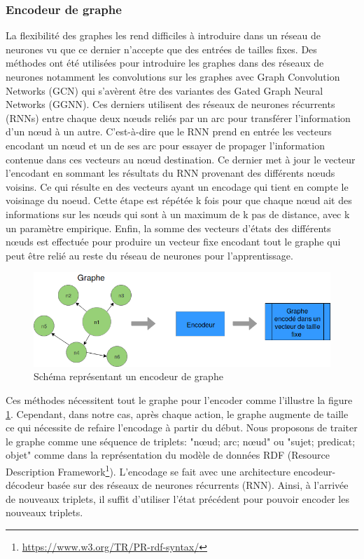 \subsubsection*{Encodeur de graphe}
La flexibilité des graphes les rend difficiles à introduire dans un réseau de neurones vu que ce dernier n'accepte que des entrées de tailles fixes. Des méthodes ont été utilisées pour introduire les graphes dans des réseaux de neurones notamment les convolutions sur les graphes avec Graph Convolution Networks (GCN)\citep{KipfW17} qui s'avèrent être des variantes des Gated Graph Neural Networks (GGNN)\citep{Li2016GatedGS}. Ces derniers utilisent des réseaux de neurones récurrents (RNNs) entre chaque deux n\oe{}uds reliés par un arc pour transférer l'information d'un n\oe{}ud à un autre. C'est-à-dire que le RNN prend en entrée les vecteurs encodant un n\oe{}ud et un de ses arc pour essayer de propager l'information contenue dans ces vecteurs au n\oe{}ud destination. Ce dernier met à jour le vecteur l'encodant en sommant les résultats du RNN provenant des différents n\oe{}uds voisins. Ce qui résulte en des vecteurs ayant un encodage qui tient en compte le voisinage du noeud. Cette étape est répétée k fois pour que chaque n\oe{}ud ait des informations sur les n\oe{}uds qui sont à un maximum de k pas de distance, avec k un paramètre empirique. Enfin, la somme des vecteurs d'états des différents n\oe{}uds est effectuée pour produire un vecteur fixe encodant tout le graphe qui peut être relié au reste du réseau de neurones pour l'apprentissage.
\begin{figure}[H] 
	\centering
	\includegraphics[width=0.9\linewidth]{images/Conception/DM/encoder.png}
	\caption{Schéma représentant un encodeur de graphe}\label{encoder}
	
\end{figure}
\par Ces méthodes nécessitent tout le graphe pour l'encoder comme l'illustre la figure \ref{encoder}. Cependant, dans notre cas, après chaque action, le graphe augmente de taille ce qui nécessite de refaire l'encodage à partir du début. Nous proposons de traiter le graphe comme une séquence de triplets: "n\oe{}ud; arc; n\oe{}ud" ou "sujet; predicat; objet" comme dans la représentation du modèle de données RDF (Resource Description Framework\footnote{\hyperlink{https://www.w3.org/TR/PR-rdf-syntax/}{https://www.w3.org/TR/PR-rdf-syntax/}}). L'encodage se fait avec une architecture encodeur-décodeur basée sur des réseaux de neurones récurrents (RNN). Ainsi, à l'arrivée de nouveaux triplets, il suffit d'utiliser l'état précédent pour pouvoir encoder les nouveaux triplets.

